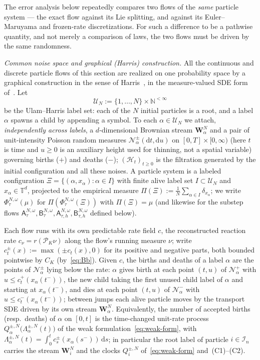 \documentclass[a4paper,fleqn]{cas-sc}
\theoremstyle{definition}
\theoremstyle{remark}
\begin{document}
The error analysis below repeatedly compares two flows of the \emph{same}
particle system --- the exact flow against its Lie splitting, and against its
Euler--Maruyama and frozen-rate discretizations. For such a difference to be a
pathwise quantity, and not merely a comparison of laws, the two flows must be
driven by the same randomness.

\emph{Common noise space and graphical (Harris) construction.} All the continuous and discrete particle flows of this section
are realized on one probability space by a graphical construction in the sense of
Harris~\cite{harris1972nearest,harris1978additive}, in the measure-valued SDE form
of~\cite{fournier2004microscopic,bansaye2015stochastic}. Let
\[
\mathcal U_N:=\{1,\ldots,N\}\times\mathbb N^{<\infty}
\]
be the Ulam--Harris label set: each of the $N$ initial particles is a root, and a
label $\alpha$ spawns a child by appending a symbol. To each $\alpha\in\mathcal U_N$
we attach, \emph{independently across labels}, a $d$-dimensional Brownian stream
$\mathbf W^N_\alpha$ and a pair of unit-intensity Poisson random measures
$\mathcal N^{\pm}_\alpha(\mathrm dt,\mathrm du)$ on $[0,T]\times[0,\infty)$ (here $t$ is
time and $u\ge0$ is an auxiliary height used for thinning, not a spatial variable)
governing births ($+$) and deaths ($-$); $(\mathcal H_t)_{t\ge0}$ is the filtration generated by
the initial configuration and all these noises. A particle system is a labeled
configuration $\Xi=\{(\alpha,x_\alpha):\alpha\in I\}$ with finite alive label set
$I\subset\mathcal U_N$ and $x_\alpha\in\mathbb T^d$, projected to the empirical measure
$\Pi(\Xi):=\frac1N\sum_{\alpha\in I}\delta_{x_\alpha}$; we write
$\Phi^{N,\omega}_\tau(\mu)$ for $\Pi(\Phi^{N,\omega}_\tau(\Xi))$ with $\Pi(\Xi)=\mu$
(and likewise for the substep flows $\mathsf A^{N,\omega}_\tau,\mathsf B^{N,\omega}_\tau,
\mathsf A^{N,\omega}_{\tau,h},\mathsf B^{N,\omega}_{\tau,h}$ defined below).

Each flow runs with its own predictable rate field $c$, the reconstructed reaction rate
$c_\nu=r(\mathcal P_K\nu)$ along the flow's running measure $\nu$; write
$c^\pm_t(x):=\max(\pm c_t(x),0)$ for its positive and negative parts, both bounded
pointwise by $C_K$ (by~\eqref{eq:Bb}). Given $c$, the births and deaths of a label
$\alpha$ are the points of $\mathcal N^\pm_\alpha$ lying below the rate: $\alpha$ gives
birth at each point $(t,u)$ of $\mathcal N^{+}_\alpha$ with $u\le c^+_t(x_\alpha(t^-))$,
the new child taking the first unused child label of $\alpha$ and starting at
$x_\alpha(t^-)$, and dies at each point $(t,u)$ of $\mathcal N^{-}_\alpha$ with
$u\le c^-_t(x_\alpha(t^-))$; between jumps each alive particle moves by the transport SDE
driven by its own stream $\mathbf W^N_\alpha$. Equivalently, the number of accepted
births (resp.\ deaths) of $\alpha$ on $[0,t]$ is the time-changed unit-rate process
$Q^{\pm,N}_\alpha\!\bigl(\Lambda^{\pm,N}_\alpha(t)\bigr)$ of the weak
formulation~\eqref{eq:weak-form}, with
$\Lambda^{\pm,N}_\alpha(t)=\int_0^t c^\pm_s(x_\alpha(s^-))\,\mathrm ds$; in particular the
root label of particle $i\in\mathcal I_n$ carries the stream $\mathbf W^N_i$ and the
clocks $Q^{\pm,N}_i$ of~\eqref{eq:weak-form} and~(C1)--(C2).
\end{document}

